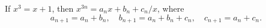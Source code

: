 If $x^{3} = x + 1$, then $x^{3n} = a_{n}x + b_{n} + c_{n}/x$, where
\[
a_{n+1} = a_{n} + b_{n},\quad
b_{n+1} = a_{n} + b_{n} + c_{n},\quad
c_{n+1} = a_{n} + c_{n}.
\]

